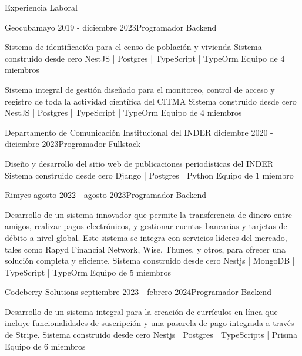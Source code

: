 \documentclass{resume}
\begin{document}
	
	\begin{rSection}{Experiencia Laboral}
		\begin{rSubsection}{Geocuba}{mayo 2019 - diciembre 2023}{Programador Backend}{}
			\item Sistema de identificación para el censo de población y vivienda 
				\subitem Sistema construido desde cero
				\subitem NestJS | Postgres | TypeScript | TypeOrm
				\subitem Equipo de 4 miembros
			\newline
				
			\item Sistema integral de gestión diseñado para el monitoreo, control de acceso y registro de toda la actividad científica del CITMA
				\subitem Sistema construido desde cero
				\subitem NestJS | Postgres | TypeScript | TypeOrm
				\subitem Equipo de 4 miembros
		\end{rSubsection}
	
		\begin{rSubsection}{Departamento de Comunicación Institucional del INDER}{ diciembre 2020 - diciembre 2023}{Programador Fullstack}{}
			\item Diseño y desarrollo del sitio web de publicaciones periodísticas del INDER 
				\subitem Sistema construido desde cero
				\subitem Django | Postgres | Python
				\subitem Equipo de 1 miembro
			
		\end{rSubsection}
		
		\begin{rSubsection}{Rimycs}{ agosto 2022 - agosto 2023}{Programador Backend}{}
			\item Desarrollo de un sistema innovador que permite la transferencia de dinero entre	amigos, realizar pagos electrónicos, y gestionar cuentas bancarias y tarjetas de débito a nivel global. Este sistema se integra con servicios líderes del mercado, tales como Rapyd Financial Network, Wise, Thunes, y otros, para ofrecer una solución completa y
			eficiente. 
				\subitem Sistema construido desde cero
				\subitem Nestjs | MongoDB | TypeScript | TypeOrm
				\subitem Equipo de 5 miembros
			
		\end{rSubsection}	
	
		\begin{rSubsection}{Codeberry Solutions}{ septiembre 2023 - febrero 2024}{Programador Backend}{}
			\item Desarrollo de un sistema integral para la creación de currículos en línea que incluye funcionalidades de suscripción y una pasarela de pago integrada a través de Stripe. 
				\subitem Sistema construido desde cero
				\subitem Nestjs | Postgres | TypeScripts | Prisma
				\subitem Equipo de 6 miembros
			

\end{rSubsection}
\end{rSection}
\end{document}
